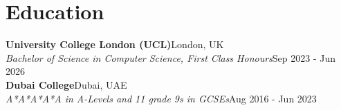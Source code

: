 \section{Education}
\textbf{University College London (UCL)}\hfill London, UK\\[0pt]
\textit{Bachelor of Science in Computer Science, First Class Honours}\hfill Sep 2023 - Jun 2026\\[2pt]
\textbf{Dubai College}\hfill Dubai, UAE\\[0pt]
\textit{A*A*A*A*A in A-Levels and 11 grade 9s in GCSEs}\hfill Aug 2016 - Jun 2023
